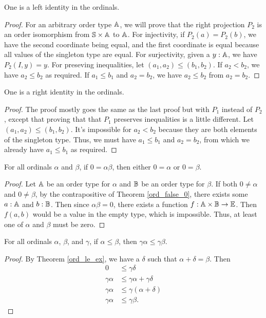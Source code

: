 \documentclass[../../math.tex]{subfiles}
\begin{document}
\begin{instance}
    One is a left identity in the ordinals.
\end{instance}
\begin{proof}
    For an arbitrary order type $\mathbb{A}$, we will prove that the right projection
    $P_2$ is an order isomorphism from $\mathbb{S} \times \mathbb{A}$ to $\mathbb{A}$.  For injectivity,
    if $P_2(a) = P_2(b)$, we have the second coordinate being equal, and the
    first coordinate is equal because all values of the singleton type are
    equal.  For surjectivity, given a $y : \mathbb{A}$, we have $P_2(I, y) = y$.  For
    preseving inequalities,  let $(a_1, a_2) \leq (b_1, b_2)$.  If $a_2 < b_2$,
    we have $a_2 \leq b_2$ as required.  If $a_1 \leq b_1$ and $a_2 = b_2$, we
    have $a_2 \leq b_2$ from $a_2 = b_2$.
\end{proof}

\begin{instance}
    One is a right identity in the ordinals.
\end{instance}
\begin{proof}
    The proof mostly goes the same as the last proof but with $P_1$ instead of
    $P_2$, except that proving that that $P_1$ preserves inequalities is a
    little different.  Let $(a_1, a_2) \leq (b_1, b_2)$.  It's impossible for
    $a_2 < b_2$ because they are both elements of the singleton type.  Thus, we
    must have $a_1 \leq b_1$ and $a_2 = b_2$, from which we already have $a_1
    \leq b_1$ as required.
\end{proof}

\begin{theorem} \label{ord_mult_zero}
    For all ordinals $\alpha$ and $\beta$, if $0 = \alpha \beta$, then either $0
    = \alpha$ or $0 = \beta$.
\end{theorem}
\begin{proof}
    Let $\mathbb{A}$ be an order type for $\alpha$ and $\mathbb{B}$ be an order type for
    $\beta$.  If both $0 \neq \alpha$ and $0 \neq \beta$, by the contrapositive
    of Theorem \ref{ord_false_0}, there exists some $a : \mathbb{A}$ and $b : \mathbb{B}$.  Then
    since $\alpha\beta = 0$, there exists a function $f : \mathbb{A} \times \mathbb{B} \to \mathbb{E}$.
    Then $f(a, b)$ would be a value in the empty type, which is impossible.
    Thus, at least one of $\alpha$ and $\beta$ must be zero.
\end{proof}

\begin{theorem} \label{ord_le_lmult}
    For all ordinals $\alpha$, $\beta$, and $\gamma$, if $\alpha \leq \beta$,
    then $\gamma \alpha \leq \gamma \beta$.
\end{theorem}
\begin{proof}
    By Theorem \ref{ord_le_ex}, we have a $\delta$ such that $\alpha + \delta =
    \beta$.  Then
    \begin{align*}
        0 &\leq \gamma \delta \\
        \gamma \alpha &\leq \gamma \alpha + \gamma \delta \\
        \gamma \alpha &\leq \gamma (\alpha + \delta) \\
        \gamma \alpha &\leq \gamma \beta.
    \end{align*}
\end{proof}
\end{document}
